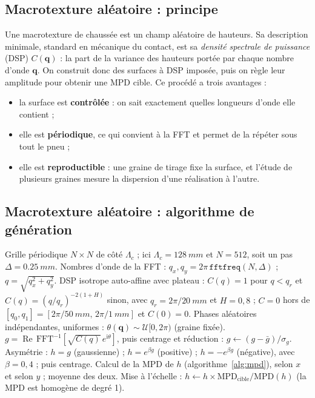 \documentclass[11pt,a4paper]{article}
\newcommand{\ii}{\mathrm{i}}
\begin{document}
\subsection{Macrotexture aléatoire : principe}
Une macrotexture de chaussée est un champ aléatoire de hauteurs. Sa description minimale, standard
en mécanique du contact, est sa \emph{densité spectrale de puissance} (DSP) $C(\bm q)$ : la part
de la variance des hauteurs portée par chaque nombre d'onde $\bm q$. On construit donc des
surfaces à DSP imposée, puis on règle leur amplitude pour obtenir une MPD cible. Ce procédé a
trois avantages :
\begin{itemize}[nosep]
\item la surface est \textbf{contrôlée} : on sait exactement quelles longueurs d'onde elle
      contient ;
\item elle est \textbf{périodique}, ce qui convient à la FFT et permet de la répéter sous tout le
      pneu ;
\item elle est \textbf{reproductible} : une graine de tirage fixe la surface, et l'étude de
      plusieurs graines mesure la dispersion d'une réalisation à l'autre.
\end{itemize}

\subsection{Macrotexture aléatoire : algorithme de génération}
\begin{algorithm}[H]
\caption{Génération d'une macrotexture de MPD cible (\texttt{contact.random\_texture})}
\begin{algorithmic}[1]
\State Grille périodique $N\times N$ de côté $\Lambda_c$ ; ici $\Lambda_c=\SI{128}{mm}$ et
       $N=512$, soit un pas $\Delta=\SI{0.25}{mm}$.
\State Nombres d'onde de la FFT : $q_x,q_y=2\pi\,\texttt{fftfreq}(N,\Delta)$ ; $q=\sqrt{q_x^2+q_y^2}$.
\State DSP isotrope auto-affine avec plateau :
       $C(q)=1$ pour $q<q_r$ et $C(q)=(q/q_r)^{-2(1+H)}$ sinon, avec $q_r=2\pi/\SI{20}{mm}$ et
       $H=0{,}8$ ; $C=0$ hors de $[q_0,q_1]=[2\pi/\SI{50}{mm},\,2\pi/\SI{1}{mm}]$ et $C(0)=0$.
\State Phases aléatoires indépendantes, uniformes : $\theta(\bm q)\sim\mathcal U[0,2\pi)$ (graine fixée).
\State $g=\operatorname{Re}\,\mathrm{FFT}^{-1}\!\left[\sqrt{C(q)}\,e^{\ii\theta}\right]$, puis
       centrage et réduction : $g\leftarrow(g-\bar g)/\sigma_g$.
\State Asymétrie : $h=g$ (gaussienne) ; $h=e^{\beta g}$ (positive) ; $h=-e^{\beta g}$ (négative),
       avec $\beta=0{,}4$ ; puis centrage.
\State Calcul de la MPD de $h$ (algorithme~\ref{alg:mpd}), selon $x$ et selon $y$ ; moyenne des deux.
\State Mise à l'échelle : $h\leftarrow h\times\text{MPD}_{\text{cible}}/\text{MPD}(h)$ (la MPD est
       homogène de degré 1).
\end{algorithmic}
\end{algorithm}
\end{document}
